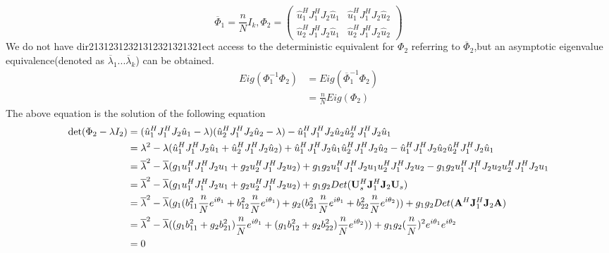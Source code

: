 \documentclass[11pt,a4paper]{article}
\begin{document}
\begin{equation}
    \overline{\Phi}_1 = \frac{n}{N} I_k,  \Phi_2 = \begin{pmatrix} 
\hat{u}_1^HJ_1^HJ_2\hat{u}_1 & \hat{u}^H_1J_1^HJ_2\hat{u}_2 \\
\hat{u}_2^HJ_1^HJ_2\hat{u}_1 & \hat{u}^H_2J_1^HJ_2\hat{u}_2
\end{pmatrix}
\end{equation}
We do not have dir21312312321312321321321ect access to the deterministic equivalent for $\Phi_2$ referring to $\overline{\Phi}_2$,but an asymptotic eigenvalue equivalence(denoted as $\overline{\lambda}_1 ... \overline{\lambda}_k$) can be obtained.
\begin{align}
    Eig(\Phi_1^{-1}\Phi_2) & = Eig(\overline{\Phi}_1^{-1} \Phi_2) \\
    &= \frac{n}{N}Eig(\Phi_2)
\end{align}
The above equation is the solution of the following equation
$$
\begin{aligned}
    \det(\Phi_2 - \lambda I_2) &= (\hat{u}_1^HJ_1^HJ_2\hat{u}_1-\lambda)
(\hat{u}_2^HJ_1^HJ_2\hat{u}_2-\lambda) - \hat{u}_1^HJ_1^HJ_2\hat{u}_2\hat{u}_2^HJ_1^HJ_2\hat{u}_1 \\
&=\lambda^2 - \lambda(\hat{u}_1^HJ_1^HJ_2\hat{u}_1 + \hat{u}_2^HJ_1^HJ_2\hat{u}_2)+ 
\hat{u}_1^HJ_1^HJ_2\hat{u}_1\hat{u}_2^HJ_1^HJ_2\hat{u}_2 - \hat{u}_1^HJ_1^HJ_2\hat{u}_2\hat{u}_2^HJ_1^HJ_2\hat{u}_1 \\
&=\overline{\lambda}^2 - \overline{\lambda}( g_1{u}_1^HJ_1^HJ_2 {u}_1 +  g_2{u}_2^HJ_1^HJ_2 {u}_2)+ 
g_1g_2{u}_1^HJ_1^HJ_2{u}_1{u}_2^HJ_1^HJ_2{u}_2 - g_1g_2{u}_1^HJ_1^HJ_2{u}_2{u}_2^HJ_1^HJ_2{u}_1 \\
&=\overline{\lambda}^2 - \overline{\lambda}( g_1{u}_1^HJ_1^HJ_2 {u}_1 +  g_2{u}_2^HJ_1^HJ_2 {u}_2)+ 
g_1g_2 Det({\mathbf{U}}_s^H {\mathbf{J}}_1^H{\mathbf{J}}_2 {\mathbf{U}}_s) \\
&=\overline{\lambda}^2 - \overline{\lambda}( g_1(b_{11}^2 \frac{n}{N}e^{i\theta_1}+b_{12}^2\frac{n}{N}e^{i\theta_1}) +  g_2(b_{21}^2 \frac{n}{N}e^{i\theta_1}+b_{22}^2\frac{n}{N}e^{i\theta_2}))+ 
g_1g_2 Det({\mathbf{A}}^H {\mathbf{J}}_1^H{\mathbf{J}}_2 {\mathbf{A}}) \\
&=\overline{\lambda} ^2 - \overline{\lambda}((g_1b_{11}^2 + g_2 b_{21}^2)\frac{n}{N} e^{i\theta_1} + (g_1b_{12}^2 + g_2 b_{22}^2)\frac{n}{N} e^{i\theta_2}))+g_1g_2(\frac{n}{N})^2 e^{i\theta_1} e^{i\theta_2} \\
&= 0
\end{aligned}$$
\end{document}
